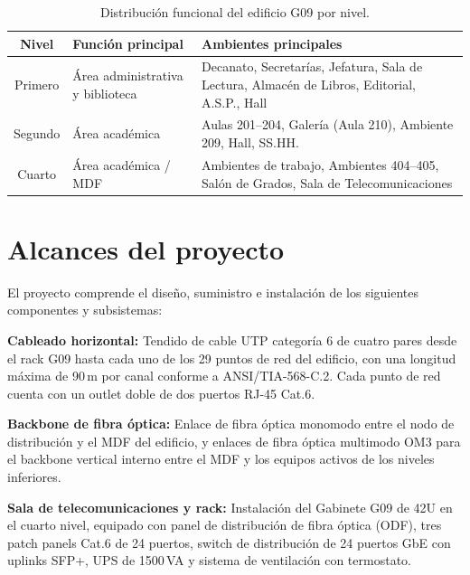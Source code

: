 \begin{table}[H]
    \centering
    \caption{Distribución funcional del edificio G09 por nivel.}
    \label{tab:distribucion_niveles}
    \begin{tabular}{|c|p{5cm}|p{6.5cm}|}
        \hline
        \textbf{Nivel} & \textbf{Función principal} & \textbf{Ambientes principales} \\
        \hline
        Primero & Área administrativa y biblioteca &
        Decanato, Secretarías, Jefatura, Sala de Lectura,
        Almacén de Libros, Editorial, A.S.P., Hall \\
        \hline
        Segundo & Área académica &
        Aulas 201--204, Galería (Aula 210),
        Ambiente 209, Hall, SS.HH. \\
        \hline
        Cuarto  & Área académica / MDF &
        Ambientes de trabajo, Ambientes 404--405,
        Salón de Grados, Sala de Telecomunicaciones \\
        \hline
    \end{tabular}
\end{table}%
\nobreak\vspace{-0.3cm}
\section{Alcances del proyecto}
\label{sec:alcances}

El proyecto comprende el diseño, suministro e instalación de los siguientes
componentes y subsistemas:

\textbf{Cableado horizontal:} Tendido de cable UTP categoría 6 de cuatro pares
desde el rack G09 hasta cada uno de los 29 puntos de red del edificio, con una
longitud máxima de 90\,m por canal conforme a \mbox{ANSI/TIA-568-C.2}. Cada
punto de red cuenta con un outlet doble de dos puertos RJ-45 Cat.6.

\textbf{Backbone de fibra óptica:} Enlace de fibra óptica monomodo entre
el nodo de distribución y el MDF del edificio, y enlaces
de fibra óptica multimodo OM3 para el backbone vertical interno entre el MDF y
los equipos activos de los niveles inferiores.

\textbf{Sala de telecomunicaciones y rack:} Instalación del Gabinete G09 de 42U
en el cuarto nivel, equipado con panel de distribución de fibra óptica (ODF),
tres patch panels Cat.6 de 24 puertos, switch de distribución de 24 puertos GbE
con uplinks SFP+, UPS de 1500\,VA y sistema de ventilación con termostato.

